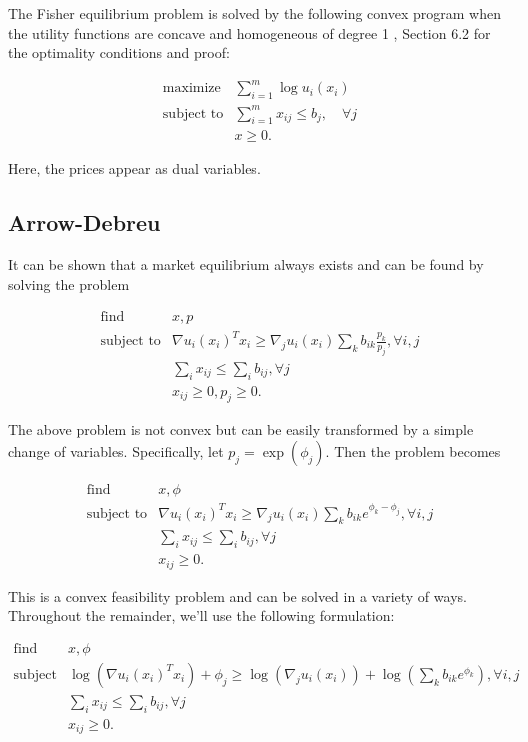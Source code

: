 \documentclass{article}
\begin{document}
The Fisher equilibrium problem is solved by the following convex program when the utility functions are concave and homogeneous of degree 1 \cite{nisan2007algorithmic}, Section 6.2 for the optimality conditions and proof:

\[
\begin{array}{ll}
\mbox{maximize} & \sum_{i=1}^m \log u_i(x_i) \\
\mbox{subject to} & \sum_{i=1}^m x_{ij} \leq b_j, \quad \forall j\\
& x \geq 0.
\end{array}
\]

Here, the prices appear as dual variables.

\subsection{Arrow-Debreu}
It can be shown that a market equilibrium always exists and can be found by solving the problem

\[
\begin{array}{ll}
\mbox{find} & x, p \\
\mbox{subject to} & \nabla u_i(x_i)^T x_i \geq  \nabla_j u_i(x_i) \sum_k b_{ik} \frac{p_k}{p_j}, \forall i,j\\
& \sum_i x_{ij} \leq \sum_i b_{ij}, \forall j\\
& x_{ij} \geq 0, p_j \geq 0.
\end{array}
\]


The above problem is not convex but can be easily transformed by a simple change of variables. Specifically, let $p_j = \exp(\phi_j)$.
Then the problem becomes

\[
\begin{array}{ll}
\mbox{find} & x, \phi \\
\mbox{subject to} & \nabla u_i(x_i)^T x_i \geq  \nabla_j u_i(x_i) \sum_k b_{ik} e^{\phi_k - \phi_j}, \forall i,j\\
& \sum_i x_{ij} \leq \sum_i b_{ij}, \forall j\\
& x_{ij} \geq 0.
\end{array}
\]

This is a convex feasibility problem and can be solved in a variety of ways.
Throughout the remainder, we'll use the following formulation:

\[
\begin{array}{ll}
\mbox{find} & x, \phi \\
\mbox{subject to} & \log(\nabla u_i(x_i)^T x_i) + \phi_j \geq  \log(\nabla_j u_i(x_i)) +  \log(\sum_k b_{ik} e^{\phi_k}), \forall i,j\\
& \sum_i x_{ij} \leq \sum_i b_{ij}, \forall j\\
& x_{ij} \geq 0.
\end{array}
\]
\end{document}

